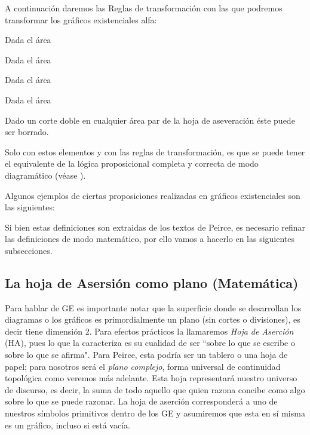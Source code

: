 \documentclass[
	fontsize=10pt, %
	twoside=true, %
	secnumdepth=1, %
	abstract=true, %
]{kaohandt}
\begin{document}
A continuación daremos las Reglas de transformación con las que podremos transformar los gráficos existenciales alfa:

\begin{definition}
	Dada el área
\end{definition}

\begin{definition}
	Dada el área
\end{definition}

\begin{definition}
	Dada el área
\end{definition}

\begin{definition}
	Dada el área
\end{definition}

\begin{definition}
	Dado un corte doble en cualquier área par de la hoja de aseveración éste puede ser borrado.
\end{definition}

Solo con estos elementos y con las reglas de transformación, es que se puede tener el equivalente de la lógica proposicional completa y correcta de modo diagramático (véase ).

Algunos ejemplos de ciertas proposiciones realizadas en gráficos existenciales son las siguientes:



Si bien estas definiciones son extraidas de los textos de Peirce, es necesario refinar las definiciones de modo matemático, por ello vamos a hacerlo en las siguientes subsecciones.
\subsection{La hoja de Asersión como plano (Matemática)}

Para hablar de GE es importante notar que la superficie donde se desarrollan los diagramas o los gráficos es primordialmente un plano (sin cortes o divisiones), es decir tiene dimensión 2. Para efectos prácticos la llamaremos \textit{Hoja de Aserción} (HA), pues lo que la caracteriza es su cualidad de ser ``sobre lo que se escribe o sobre lo que se afirma". Para Peirce, esta podría ser un tablero o una hoja de papel; para nosotros será el \emph{plano complejo}, forma universal de continuidad topológica como veremos más adelante. Esta hoja representará nuestro universo de discurso, es decir, la suma de todo aquello que quien razona concibe como algo sobre lo que se puede razonar. La hoja de aserción corresponderá a uno de nuestros símbolos primitivos dentro de los GE y asumiremos que esta en sí misma es un gráfico, incluso si está vacía. 
\end{document}
